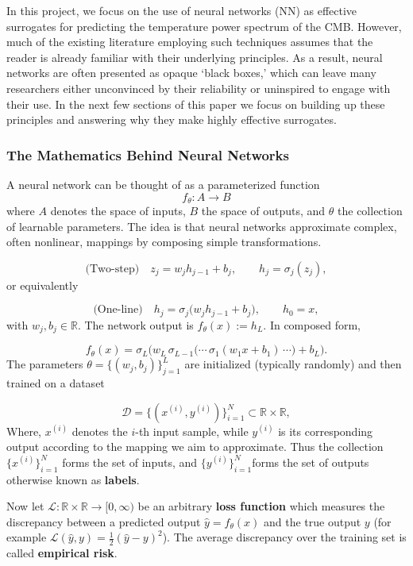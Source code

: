 \documentclass[11pt,a4paper]{article}
\numberwithin{equation}{section}
\begin{document}
In this project, we focus on the use of neural networks (NN) as effective surrogates for predicting the temperature power spectrum of the CMB. 
However, much of the existing literature employing such techniques assumes that the reader is already familiar with their underlying principles. 
As a result, neural networks are often presented as opaque ‘black boxes,’ which can leave many researchers either unconvinced by their reliability or uninspired to engage with their use. In the next few sections of this paper we focus on building up these principles and answering why they make highly effective surrogates. 

\subsubsection{The Mathematics Behind Neural Networks}

A neural network can be thought of as a parameterized function $$f_\theta : A \to B$$ 
where $A$ denotes the space of inputs, $B$ the space of outputs, and $\theta$ the collection of learnable parameters. 
The idea is that neural networks approximate complex, often nonlinear, mappings by composing simple transformations.

$$
\text{(Two-step)}\quad
z_j = w_j h_{j-1} + b_j,\qquad h_j = \sigma_j(z_j),
$$
or equivalently

$$
\text{(One-line)}\quad
h_j = \sigma_j\!\big(w_j h_{j-1} + b_j\big),\qquad h_0 = x,
$$
with $w_j,b_j\in\mathbb{R}$. The network output is $f_\theta(x):=h_L$. In composed form, 

$$
f_\theta(x)=\sigma_L\!\Big(w_L\,\sigma_{L-1}\big(\cdots\,\sigma_1(w_1 x + b_1)\,\cdots\big)+b_L\Big).
$$
The parameters $\theta=\{(w_j,b_j)\}_{j=1}^L$ are initialized (typically randomly) and then trained on a dataset

$$
\mathcal{D}=\{(x^{(i)},y^{(i)})\}_{i=1}^N \subset \mathbb{R}\times\mathbb{R},
$$  
Where, $x^{(i)}$ denotes the $i$-th input sample, while $y^{(i)}$ is its corresponding output according to the mapping we aim to approximate. Thus the collection $\{x^{(i)}\}_{i=1}^N$ forms the set of inputs, and $\{y^{(i)}\}_{i=1}^N$forms the set of outputs otherwise known as \textbf{labels}.  

Now let $\mathcal{L}: \mathbb{R} \times \mathbb{R} \to [0, \infty)$ be an arbitrary \textbf{loss function} which measures the discrepancy between a predicted output $\hat y=f_\theta(x)$ and the true output $y$ (for example $\mathcal{L}(\hat y,y)=\tfrac12(\hat y-y)^2$). The average discrepancy over the training set is called \textbf{empirical risk}.
\end{document}
